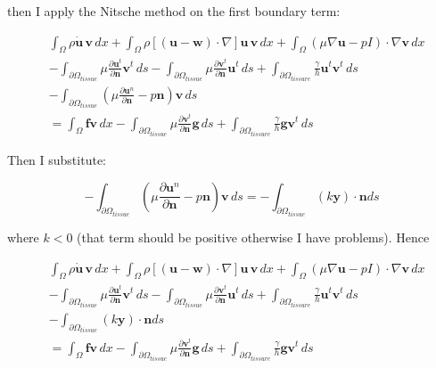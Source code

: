 \documentclass[11pt,a4paper,titlepage]{report}
\begin{document}
then I apply the Nitsche method on the first boundary term: 

\begin{align*}
& \int_{\Omega} \rho \dot{\mathbf{u}} \, \mathbf{v} \, dx
+ \int_{\Omega} \rho [(\mathbf{u - w}) \cdot \nabla] \mathbf{u} \, \mathbf{v} \, dx
+ \int_{\Omega} (\mu \nabla \mathbf{u} - pI) \cdot \nabla \mathbf{v} \, dx \\
& - \int_{\partial \Omega_{tissue}} \mu \frac{\partial \mathbf{u}^t}{\partial \mathbf{n}} \mathbf{v}^t \, ds 
- \int_{\partial \Omega_{tissue}} \mu \frac{\partial \mathbf{v}^t}{\partial \mathbf{n}} \mathbf{u}^t \, ds 
+ \int_{\partial \Omega_{tissure}} \frac{\gamma}{h} \mathbf{u}^t \mathbf{v}^t \, ds \\
& - \int_{\partial \Omega_{tissue}} ( \mu \frac{\partial \mathbf{u}^n}{\partial \mathbf{n}} - p \mathbf{n} ) \mathbf{v} \, ds \\
& =  \int_{\Omega} \mathbf{f} \mathbf{v} \, dx
- \int_{\partial \Omega_{tissue}} \mu \frac{\partial \mathbf{v}^t}{\partial \mathbf{n}} \mathbf{g} \, ds 
+ \int_{\partial \Omega_{tissure}} \frac{\gamma}{h} \mathbf{g} \mathbf{v}^t \, ds
\end{align*}


Then I substitute:

\[
- \int_{\partial \Omega_{tissue}} ( \mu \frac{\partial \mathbf{u}^n}{\partial \mathbf{n}} - p \mathbf{n} ) \mathbf{v} \, ds
= - \int_{\partial \Omega_{tissue}} (k \mathbf{y}) \cdot \mathbf{n} ds 
\]

where $k < 0$ (that term should be positive otherwise I have problems). Hence

\begin{align*}
& \int_{\Omega} \rho \dot{\mathbf{u}} \, \mathbf{v} \, dx
+ \int_{\Omega} \rho [(\mathbf{u - w}) \cdot \nabla] \mathbf{u} \, \mathbf{v} \, dx
+ \int_{\Omega} (\mu \nabla \mathbf{u} - pI) \cdot \nabla \mathbf{v} \, dx \\
& - \int_{\partial \Omega_{tissue}} \mu \frac{\partial \mathbf{u}^t}{\partial \mathbf{n}} \mathbf{v}^t \, ds 
- \int_{\partial \Omega_{tissue}} \mu \frac{\partial \mathbf{v}^t}{\partial \mathbf{n}} \mathbf{u}^t \, ds 
+ \int_{\partial \Omega_{tissure}} \frac{\gamma}{h} \mathbf{u}^t \mathbf{v}^t \, ds \\
& - \int_{\partial \Omega_{tissue}} (k \mathbf{y}) \cdot \mathbf{n} ds  \\
& = \int_{\Omega} \mathbf{f} \mathbf{v} \, dx
- \int_{\partial \Omega_{tissue}} \mu \frac{\partial \mathbf{v}^t}{\partial \mathbf{n}} \mathbf{g} \, ds 
+ \int_{\partial \Omega_{tissure}} \frac{\gamma}{h} \mathbf{g} \mathbf{v}^t \, ds
\end{align*}
\end{document}
